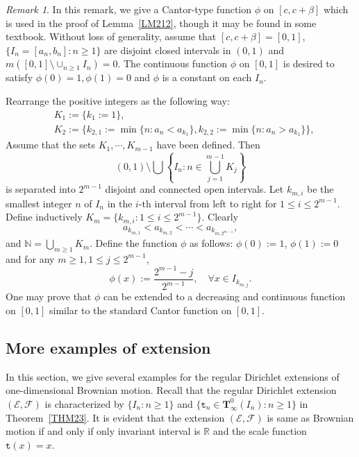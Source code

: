 \documentclass[a4paper]{amsart}
\theoremstyle{definition}
\theoremstyle{remark}
\newtheorem{remark}[theorem]{Remark}
\numberwithin{equation}{section}
\begin{document}
\begin{remark}\label{RM212}
In this remark, we give a Cantor-type function $\phi$ on $[c, c+\beta]$ which is used in the proof of Lemma~\ref{LM212}, though it may be found in some textbook. Without loss of generality, assume that $[c, c+\beta]=[0,1]$, $\{I_n=[a_n,b_n]:n\geq 1\}$ are disjoint closed intervals in $(0,1)$ and $m\left([0,1]\setminus \cup_{n\geq 1}I_n \right)=0$. The continuous function $\phi$ on $[0,1]$ is desired to satisfy $\phi(0)=1, \phi(1)=0$ and $\phi$ is a constant on each $I_n$.

Rearrange the positive integers as the following way:
\[
\begin{aligned}
	&K_1:=\{k_1:=1\},  \\
&K_2:=\{k_{2,1}:=\min\{n: a_n<a_{k_1}\}, k_{2,2}:=\min\{n: a_n>a_{k_1}\}\},
\end{aligned}
\]
Assume that the sets $K_1,\cdots,K_{m-1}$ have been defined. Then $$(0,1) \setminus \bigcup\left\{I_n: n\in \bigcup_{j=1}^{m-1}K_j\right\}$$ is separated into $2^{m-1}$
disjoint and connected open intervals. Let $k_{m,i}$ be the smallest integer $n$ of $I_n$ in the $i$-th interval from left to right for $1\le i\le 2^{m-1}$.
Define inductively $K_m=\{k_{m,i}:1\le i\le 2^{m-1}\}$. Clearly
\[
	a_{k_{m,1}}<a_{k_{m,2}}<\cdots  <a_{k_{m, 2^{m-1}}},
\]
and $\mathbb{N}=\bigcup_{m\geq 1} K_m$.
Define the function $\phi$ as follows: $\phi(0):=1$, $\phi(1):=0$ and for any $m\geq 1, 1\leq j\leq 2^{m-1}$,
\[
	\phi(x):=\frac{2^{m-1}-j}{2^{m-1}},\quad \forall x\in I_{k_{m,j}}.
\]
One may prove that $\phi$ can be extended to a decreasing and continuous function on $[0,1]$ similar to the standard Cantor function on $[0,1]$.
\end{remark}

\subsection{More examples of extension}\label{SEC23}

In this section, we give several examples for the regular Dirichlet extensions of one-dimensional Brownian motion. Recall that the regular Dirichlet extension $({{\mathcal{E}}},{{\mathcal{F}}})$ is characterized by $\{I_n:n\geq 1\}$ and $\{{{\mathtt{t}}}_n\in \mathbf{T}^0_\infty(I_n):n\geq 1\}$ in Theorem~\ref{THM23}. It is evident
that the extension $({{\mathcal{E}}},{{\mathcal{F}}})$ is same as Brownian motion if and only if only invariant interval is $\mathbb{R}$ and the scale function ${{\mathtt{t}}}(x)=x$.
\end{document}
